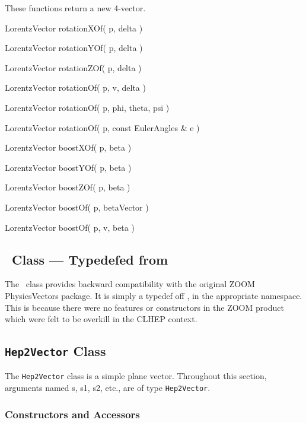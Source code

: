 \noindent
These functions return a new 4-vector.

\begin{shortlist}
  \item LorentzVector rotationXOf( p, delta ) \see{\ref{eq:rotX}}
  \item LorentzVector rotationYOf( p, delta ) \see{\ref{eq:rotY}}
  \item LorentzVector rotationZOf( p, delta ) \see{\ref{eq:rotZ}}
  \item LorentzVector rotationOf( p, v, delta ) \see{\ref{eq:axisrot}}

  \item LorentzVector rotationOf( p, phi, theta, psi ) \see{\ref{eq:eulerrot}}
  \item LorentzVector rotationOf( p, const EulerAngles \& e ) \see{\ref{eq:eulerrot}}

  \item LorentzVector boostXOf( p, beta ) \see{\ref{eq:wbX}}
  \item LorentzVector boostYOf( p, beta ) \see{\ref{eq:wbY}}
  \item LorentzVector boostZOf( p, beta ) \see{\ref{eq:wbZ}}
  \item LorentzVector boostOf( p, betaVector ) \see{\ref{eq:wboostvec}}
  \item LorentzVector boostOf( p, v, beta ) \see{\ref{eq:pureboost}}
\end{shortlist}


\subsection{\protect\LVz\ Class --- Typedefed from \LV }

The \LVz\ class provides backward compatibility with the original ZOOM
PhysicsVectors package.  
It is simply a typedef off \LV , in the appropriate namespace.
This is because there were no features or constructors in the ZOOM 
product which were felt to be 
overkill in the CLHEP context.  

\subsection{{\tt Hep2Vector} Class}

The {\tt Hep2Vector} class is a simple plane vector.
Throughout this section, arguments named s, s1, s2, etc., are of type 
{\tt Hep2Vector}.

\subsubsection{Constructors and Accessors}

